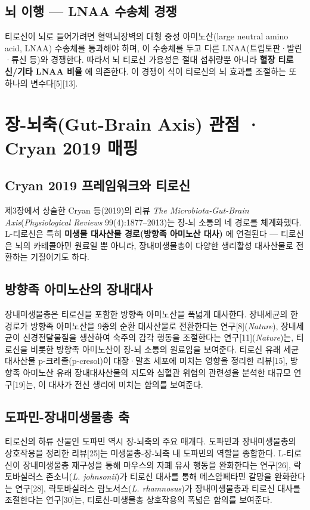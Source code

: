 \documentclass[11pt,oneside]{book}
\begin{document}
\subsection{뇌 이행 — LNAA 수송체 경쟁}
티로신이 뇌로 들어가려면 혈액뇌장벽의 대형 중성 아미노산(large neutral amino acid, LNAA) 수송체를 통과해야 하며, 이 수송체를 두고 다른 LNAA(트립토판·발린·류신 등)와 경쟁한다. 따라서 뇌 티로신 가용성은 절대 섭취량뿐 아니라 \textbf{혈장 티로신/기타 LNAA 비율} 에 의존한다. 이 경쟁이 식이 티로신의 뇌 효과를 조절하는 또 하나의 변수다[5][13].

\section{장-뇌축(Gut-Brain Axis) 관점 · Cryan 2019 매핑}
\subsection{Cryan 2019 프레임워크와 티로신}
제3장에서 상술한 Cryan 등(2019)의 리뷰 \textit{The Microbiota-Gut-Brain Axis}(\textit{Physiological Reviews} 99(4):1877–2013)는 장-뇌 소통의 네 경로를 체계화했다. L-티로신은 특히 \textbf{미생물 대사산물 경로(방향족 아미노산 대사)} 에 연결된다 — 티로신은 뇌의 카테콜아민 원료일 뿐 아니라, 장내미생물총이 다양한 생리활성 대사산물로 전환하는 기질이기도 하다.

\subsection{방향족 아미노산의 장내대사}
장내미생물총은 티로신을 포함한 방향족 아미노산을 폭넓게 대사한다. 장내세균의 한 경로가 방향족 아미노산을 9종의 순환 대사산물로 전환한다는 연구[8](\textit{Nature}), 장내세균이 신경전달물질을 생산하여 숙주의 감각 행동을 조절한다는 연구[11](\textit{Nature})는, 티로신을 비롯한 방향족 아미노산이 장-뇌 소통의 원료임을 보여준다. 티로신 유래 세균 대사산물 p-크레졸(p-cresol)이 대장·말초 세포에 미치는 영향을 정리한 리뷰[15], 방향족 아미노산 유래 장내대사산물의 지도와 심혈관 위험의 관련성을 분석한 대규모 연구[19]는, 이 대사가 전신 생리에 미치는 함의를 보여준다.

\subsection{도파민-장내미생물총 축}
티로신의 하류 산물인 도파민 역시 장-뇌축의 주요 매개다. 도파민과 장내미생물총의 상호작용을 정리한 리뷰[25]는 미생물총-장-뇌축 내 도파민의 역할을 종합한다. L-티로신이 장내미생물총 재구성을 통해 마우스의 자폐 유사 행동을 완화한다는 연구[26], 락토바실러스 존소니(\textit{L. johnsonii})가 티로신 대사를 통해 메스암페타민 갈망을 완화한다는 연구[28], 락토바실러스 람노서스(\textit{L. rhamnosus})가 장내미생물총과 티로신 대사를 조절한다는 연구[30]는, 티로신-미생물총 상호작용의 폭넓은 함의를 보여준다.
\end{document}
